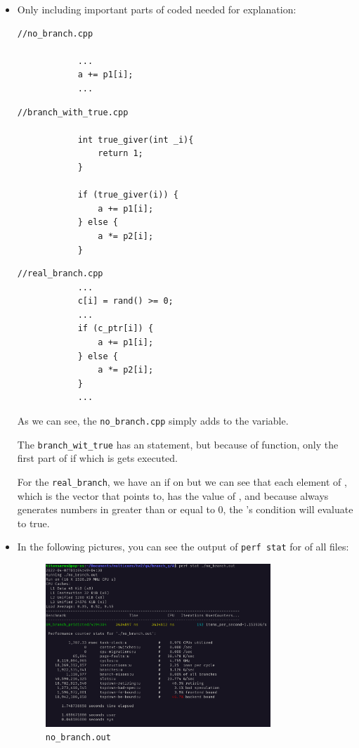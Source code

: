 \documentclass[12pt]{article}
\begin{document}
	
	\begin{itemize}
		\item 
		Only including important parts of coded needed for explanation:
		\begin{lstlisting}[style=CStyle]
			//no_branch.cpp
			
			...
			a += p1[i];
			...
		\end{lstlisting}
		
		\begin{lstlisting}[style=CStyle]
			//branch_with_true.cpp
			
			int true_giver(int _i){
				return 1;
			}
			
			if (true_giver(i)) {
				a += p1[i];
			} else {
				a *= p2[i];
			}
		\end{lstlisting}
		
		\begin{lstlisting}[style=CStyle]
			//real_branch.cpp
			...
			c[i] = rand() >= 0;
			...
			if (c_ptr[i]) {
				a += p1[i];
			} else {
				a *= p2[i];
			}
			...
		\end{lstlisting}
		
		As we can see, the \Verb+no_branch.cpp+ simply adds  to the  variable. 
		
		The \Verb+branch_wit_true+ has an  statement, but because of  function, only the first part of if which is  gets executed. 
		
		For the \Verb+real_branch+, we have an if on  but we can see that each element of , which is the vector that  points to, has the value of , and because   always generates numbers in greater than or equal to $0$, the 's condition will evaluate to true.
		
		\item
		In the following pictures, you can see the output of \Verb+perf stat+ for of all files:
		
\begin{figure}[H]
	\centering
	\includegraphics[width=0.8\textwidth]{./images/4A/no-branch.png}	
	\cprotect\caption{\Verb+no_branch.out+}
\end{figure}




\end{itemize}
\end{document}
